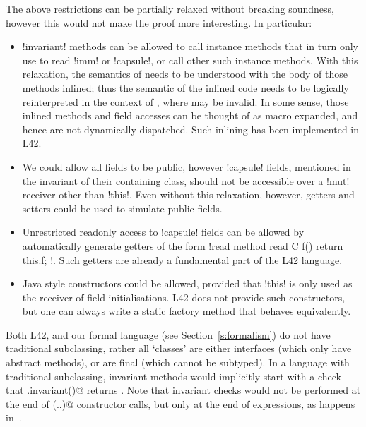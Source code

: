 The above restrictions can be partially relaxed without breaking soundness, however this would not make the proof more interesting. In particular:
\begin{itemize}
	\item \Q!invariant! methods can be allowed to call instance methods that in turn only use \Q@this@ to read \Q!imm! or \Q!capsule!, or call other such instance methods. With this relaxation, the semantics of \Q@invariant@ needs to be understood with the body of those methods inlined; thus the semantic of the inlined code needs to be logically reinterpreted in the context of \Q@invariant@, where \Q@this@ may be invalid. In some sense, those inlined methods and field accesses can be thought of as macro expanded, and hence are not dynamically dispatched. Such inlining has been implemented in L42.
	\item We could allow all fields to be public, however \Q!capsule! fields, mentioned in the invariant of their containing class, should not be accessible over a \Q!mut! receiver other than \Q!this!. Even without this relaxation, however, getters and setters could be used to simulate public fields.
	\item Unrestricted readonly access to \Q!capsule! fields can be allowed by automatically generate getters of the form \Q!read method read C f() { return this.f; }!. Such getters are already a fundamental part of the L42 language.
	
	\item Java style constructors could be allowed, provided that \Q!this! is only used as the receiver of field initialisations. L42 does not provide such constructors, but one can always write a static factory method that behaves equivalently.
\end{itemize}
Both L42, and our formal language (see Section~\ref{s:formalism}) do not have traditional subclassing, rather all `classes' are either interfaces (which only have abstract methods), or are final (which cannot be subtyped). In a language with traditional subclassing, invariant methods would implicitly start with a check that \Q@super.invariant()@ returns \Q@true@. Note that invariant checks would not be performed at the end of \Q@super(..)@ constructor calls, but only at the end of \Q@new@ expressions, as happens in~\cite{feldman2006jose}.

